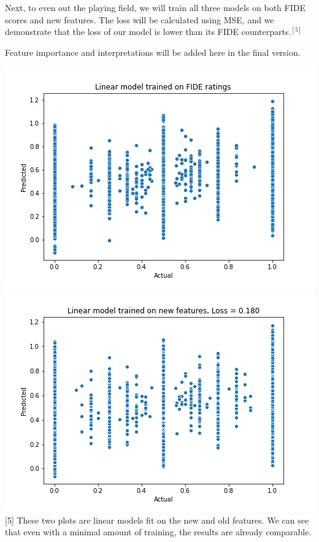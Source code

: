 \documentclass[12pt, letterpaper]{article}
\begin{document}
\begin{multicols}{2}
Next, to even out the playing field, we will train all three models on both FIDE scores and new features. The loss will be calculated using MSE, and we demonstrate that the loss of our model is lower than its FIDE counterparts.$^{[5]}$

Feature importance and interpretations will be added here in the final version.

\setlength{\parskip}{0.0cm}
\begin{center}
\begin{small}
\includegraphics[width=\linewidth]{../figures/baseline_linear.png}
\includegraphics[width=\linewidth]{../figures/new_linear_iter_0.png}
[5] These two plots are linear models fit on the new and old features. We can see that even with a minimal amount of training, the results are already comparable.
\end{small}
\end{center}
\setlength{\parskip}{0.1cm}


\end{multicols}
\end{document}
